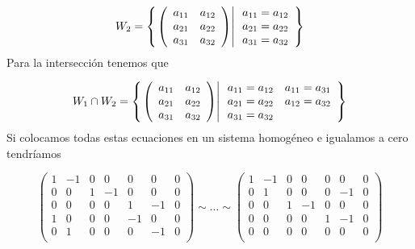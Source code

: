 \begin{enumerate}
\[W_2=\left\{ \left. 
\left(
\begin{array}{rr}
a_{11}&a_{12}\\
a_{21}&a_{22}\\
a_{31}&a_{32}
\end{array}
\right)
\right| 
\begin{array}{r}
a_{11}=a_{12}\\
a_{21}=a_{22}\\
a_{31}=a_{32}
\end{array}
 \right\}
\]
Para la intersección tenemos que

\[W_1\cap W_2=\left\{ \left. 
\left(
\begin{array}{rr}
a_{11}&a_{12}\\
a_{21}&a_{22}\\
a_{31}&a_{32}
\end{array}
\right)
\right| \begin{array}{rr}
a_{11}=a_{12}&a_{11}=a_{31}\\
a_{21}=a_{22}&a_{12}=a_{32}\\
a_{31}=a_{32}&
\end{array}
 \right\}
\]
Si colocamos todas estas ecuaciones en un sistema homog\'eneo e igualamos a cero tendr\'iamos


\[
\left(
\begin{array}{rrrrrr|r}
1    &-1     &0     &0     &0     &0     &0\\
0    &0      &1     &-1    &0     &0     &0\\
0    &0      &0     &0     &1     &-1     &0\\
1    &0      &0     &0     &-1     &0     &0\\
0    &1     &0     &0     &0     &-1     &0\\
\end{array}
\right)
\sim
\ldots
\sim
\left(
\begin{array}{rrrrrr|r}
1    &-1     &0     &0     &0     &0     &0\\
0    &1     &0     &0     &0     &-1     &0\\
0    &0      &1     &-1    &0     &0     &0\\
0    &0      &0     &0     &1     &-1     &0\\
0    &0      &0     &0     &0     &0     &0\\
\end{array}
\right)
\]


\end{enumerate}
